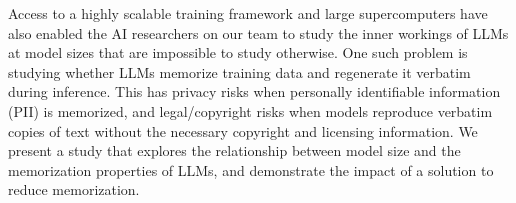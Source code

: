 Access to a highly scalable training framework and large supercomputers have
also enabled the AI researchers on our team to study the inner workings of LLMs
at model sizes that are impossible to study otherwise. One such problem is
studying whether LLMs memorize training data and regenerate it verbatim during
inference. This has privacy risks when personally identifiable information
(PII) is memorized, and legal/copyright risks when models reproduce verbatim
copies of text without the necessary copyright and licensing information. We
present a study that explores the relationship between model size and the
memorization properties of LLMs, and demonstrate the impact of a solution to
reduce memorization.

